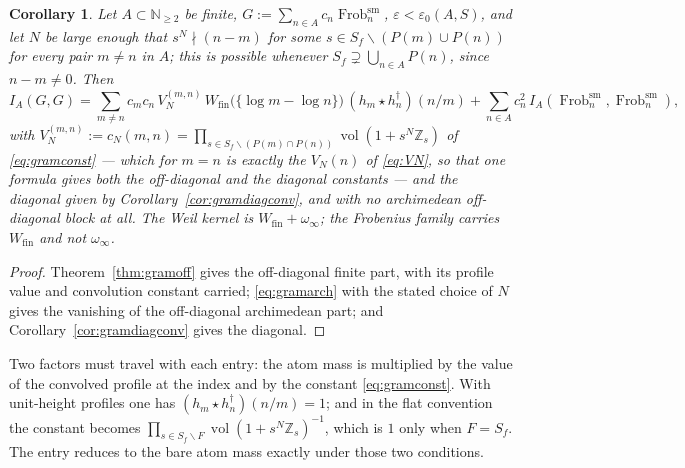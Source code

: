 \documentclass[11pt]{amsart}
\newtheorem{corollary}[theorem]{Corollary}
\theoremstyle{definition}
\theoremstyle{remark}
\newcommand{\N}{\mathbb N}
\newcommand{\Z}{\mathbb Z}
\newcommand{\Frob}{\operatorname{Frob}}
\newcommand{\vol}{\operatorname{vol}}
\newcommand{\Wfin}{W_{\mathrm{fin}}}
\begin{document}
\begin{corollary}\label{cor:onlyfinite}
Let $A\subset\N_{\ge2}$ be finite, $G:=\sum_{n\in A}c_n\Frob_n^{\mathrm{sm}}$,
$\varepsilon<\varepsilon_0(A,S)$, and let $N$ be large enough that
$s^N\nmid(n-m)$ for some $s\in S_f\smallsetminus(P(m)\cup P(n))$ for every pair
$m\ne n$ in $A$; this is possible whenever
$S_f\supsetneq\bigcup_{n\in A}P(n)$, since $n-m\ne0$. Then
\begin{equation}\label{eq:gramtotal}
  I_A(G,G)=\sum_{m\ne n}c_mc_n\,V_N^{(m,n)}\,
    \Wfin\bigl(\{\log m-\log n\}\bigr)\,(h_m\star h_n^\dagger)(n/m)
   +\sum_{n\in A}c_n^2\,I_A(\Frob_n^{\mathrm{sm}},\Frob_n^{\mathrm{sm}}),
\end{equation}
with $V_N^{(m,n)}:=c_N(m,n)=\prod_{s\in S_f\smallsetminus(P(m)\cap P(n))}
\vol(1+s^N\Z_s)$ of \eqref{eq:gramconst} --- which for $m=n$ is exactly the
$V_N(n)$ of \eqref{eq:VN}, so that one formula gives both the off-diagonal and
the diagonal constants --- and the diagonal given by
Corollary~\ref{cor:gramdiagconv}, and with \emph{no archimedean off-diagonal
block at all}. The Weil kernel is $\Wfin+\omega_\infty$; the Frobenius family
carries $\Wfin$ and not $\omega_\infty$.
\end{corollary}

\begin{proof}
Theorem~\ref{thm:gramoff} gives the off-diagonal finite part, with its profile
value and convolution constant carried; \eqref{eq:gramarch} with the stated
choice of $N$ gives the vanishing of the off-diagonal archimedean part; and
Corollary~\ref{cor:gramdiagconv} gives the diagonal.
\end{proof}

Two factors must travel with each entry: the atom mass is multiplied by the
value of the convolved profile at the index and by the constant
\eqref{eq:gramconst}. With unit-height profiles one has
$(h_m\star h_n^\dagger)(n/m)=1$; and in the flat convention the constant
becomes $\prod_{s\in S_f\smallsetminus F}\vol(1+s^N\Z_s)^{-1}$, which is $1$
only when $F=S_f$. The entry reduces to the bare atom mass exactly under those
two conditions.
\end{document}
